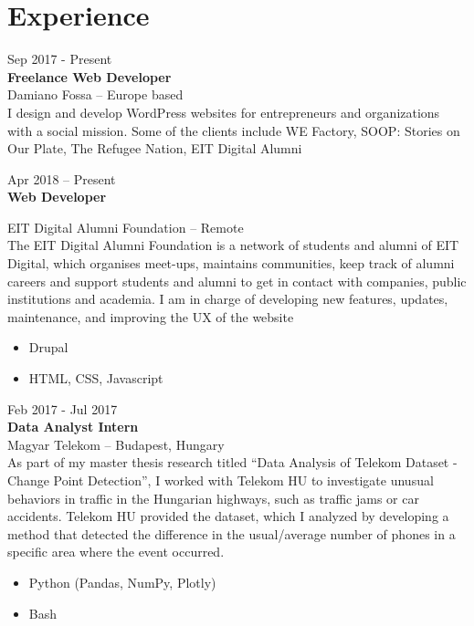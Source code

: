 \documentclass[]{friggeri-cv}
\begin{document}

\section{Experience}

{Sep 2017 - Present} \\
{\textbf{Freelance Web Developer}} \\
Damiano Fossa -- 
Europe based \\
{I design and develop WordPress websites for entrepreneurs and organizations with a social mission. Some of the clients include WE Factory, SOOP: Stories on Our Plate, The Refugee Nation, EIT Digital Alumni}\newline

{Apr 2018 -- Present} \\
{\textbf{Web Developer}} \\
{EIT Digital Alumni Foundation -- Remote \\
{The EIT Digital Alumni Foundation is a network of students and alumni of EIT Digital, which organises meet-ups, maintains communities, keep track of alumni careers and support students and alumni to get in contact with companies, public institutions and academia.
I am in charge of developing new features, updates, maintenance, and improving the UX of the website}
\begin{itemize}[noitemsep]
\item Drupal
\item HTML, CSS, Javascript \newline
\end{itemize}

{Feb 2017 - Jul 2017} \\
{\textbf{Data Analyst Intern}} \\
Magyar Telekom -- 
Budapest, Hungary \\
{}As part of my master thesis research titled “Data Analysis of Telekom Dataset - Change Point Detection”, I worked with Telekom HU to investigate unusual behaviors in traffic in the Hungarian highways, such as traffic jams or car accidents. Telekom HU provided the dataset, which I analyzed by developing a method that detected the difference in the usual/average number of phones in a specific area where the event occurred.}
\begin{itemize}[noitemsep]
\item Python (Pandas, NumPy, Plotly)
\item Bash \newline
\end{itemize}
\end{document}
